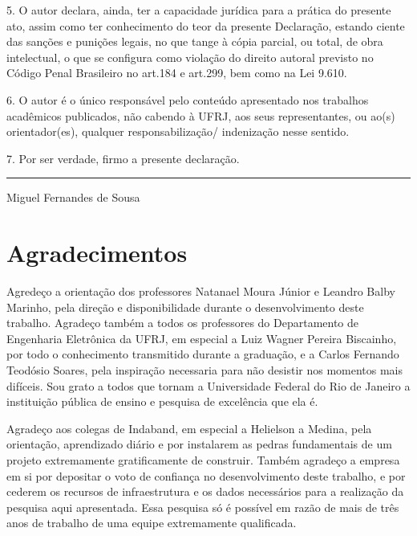 \documentclass[tcc,numbers]{coppe}
\begin{document}
5. O autor declara, ainda, ter a capacidade jurídica para a prática do presente
ato, assim como ter conhecimento do teor da presente Declaração, estando ciente
das sanções e punições legais, no que tange à cópia parcial, ou total, de obra
intelectual, o que se configura como violação do direito autoral previsto no
Código Penal Brasileiro no art.184 e art.299, bem como na Lei 9.610.

6. O autor é o único responsável pelo conteúdo apresentado nos trabalhos
acadêmicos publicados, não cabendo à UFRJ, aos seus representantes, ou ao(s)
orientador(es), qualquer responsabilização/ indenização nesse sentido.

7. Por ser verdade, firmo a presente declaração.

\vspace{4\baselineskip}

\noindent\hfill \rule{4in}{0.7pt}

\noindent\hfill Miguel Fernandes de Sousa
\newpage


  \dedication{Aos meus avós, Dona Filinha e Wilton.}

  \chapter*{Agradecimentos}

  Agredeço a orientação dos professores Natanael Moura Júnior e Leandro Balby
  Marinho, pela direção e disponibilidade durante o desenvolvimento deste
  trabalho. Agradeço também a todos os professores do Departamento de Engenharia
  Eletrônica da UFRJ, em especial a Luiz Wagner Pereira Biscainho, por todo o
  conhecimento transmitido durante a graduação, e a Carlos Fernando Teodósio
  Soares, pela inspiração necessaria para não desistir nos momentos mais
  difíceis. Sou grato a todos que tornam a Universidade Federal do Rio de
  Janeiro a instituição pública de ensino e pesquisa de excelência que ela é.

  Agradeço aos colegas de Indaband, em especial a Helielson a Medina, pela
  orientação, aprendizado diário e por instalarem as pedras fundamentais de um
  projeto extremamente gratificamente de construir. Também agradeço a empresa em
  si por depositar o voto de confiança no desenvolvimento deste trabalho, e
  por cederem os recursos de infraestrutura e os dados necessários para a
  realização da pesquisa aqui apresentada. Essa pesquisa só é possível em razão
  de mais de três anos de trabalho de uma equipe extremamente qualificada.
\end{document}
